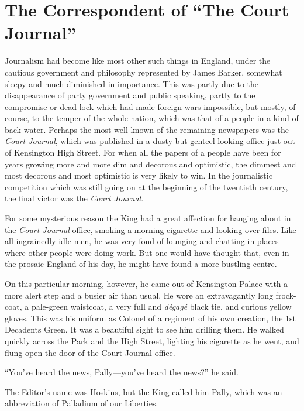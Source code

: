 \documentclass{book}
\begin{document}
\chapter{The Correspondent of “The Court Journal”}
\label{chapter-14}
Journalism had become like most other such things in England, under the cautious government and philosophy represented by James Barker, somewhat sleepy and much diminished in importance. This was partly due to the disappearance of party government and public speaking, partly to the compromise or dead-lock which had made foreign wars impossible, but mostly, of course, to the temper of the whole nation, which was that of a people in a kind of back-water. Perhaps the most well-known of the remaining newspapers was the \emph{Court Journal}, which was published in a dusty but genteel-looking office just out of Kensington High Street. For when all the papers of a people have been for years growing more and more dim and decorous and optimistic, the dimmest and most decorous and most optimistic is very likely to win. In the journalistic competition which was still going on at the beginning of the twentieth century, the final victor was the \emph{Court Journal}.

For some mysterious reason the King had a great affection for hanging about in the \emph{Court Journal} office, smoking a morning cigarette and looking over files. Like all ingrainedly idle men, he was very fond of lounging and chatting in places where other people were doing work. But one would have thought that, even in the prosaic England of his day, he might have found a more bustling centre.

On this particular morning, however, he came out of Kensington Palace with a more alert step and a busier air than usual. He wore an extravagantly long frock-coat, a pale-green waistcoat, a very full and \emph{dégagé} black tie, and curious yellow gloves. This was his uniform as Colonel of a regiment of his own creation, the 1st Decadents Green. It was a beautiful sight to see him drilling them. He walked quickly across the Park and the High Street, lighting his cigarette as he went, and flung open the door of the Court Journal office.

“You’ve heard the news, Pally—you’ve heard the news?” he said.

The Editor’s name was Hoskins, but the King called him Pally, which was an abbreviation of Palladium of our Liberties.
\end{document}
